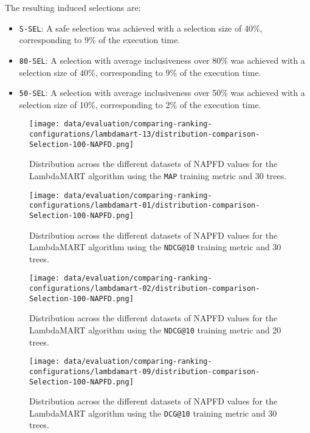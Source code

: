 The resulting induced selections are:
\begin{itemize}
    \item \texttt{S-SEL}: A safe selection was achieved with a selection size of 40\%, corresponding to 9\% of the execution time.
    \item \texttt{80-SEL}: A selection with average inclusiveness over 80\% was achieved with a selection size of 40\%, corresponding to 9\% of the execution time.
    \item \texttt{50-SEL}: A selection with average inclusiveness over 50\% was achieved with a selection size of 10\%, corresponding to 2\% of the execution time.
\end{itemize}

\begin{figure}
    \centering
    \begin{minipage}{.45\textwidth}
        \centering
        \label{fig:lambdamart-13-napfd}
        \texttt{[image: data/evaluation/comparing-ranking-configurations/lambdamart-13/distribution-comparison-Selection-100-NAPFD.png]}
        \parbox{0.9\textwidth}{\caption{Distribution across the different datasets of NAPFD values for the LambdaMART algorithm using the \texttt{MAP} training metric and 30 trees.}}
    \end{minipage}%
    \begin{minipage}{.45\textwidth}
        \centering
        \label{fig:lambdamart-01-napfd}
        \texttt{[image: data/evaluation/comparing-ranking-configurations/lambdamart-01/distribution-comparison-Selection-100-NAPFD.png]}
        \parbox{0.9\textwidth}{\caption{Distribution across the different datasets of NAPFD values for the LambdaMART algorithm using the \texttt{NDCG@10} training metric and 30 trees.}}
    \end{minipage}%
\end{figure}

\begin{figure}
    \centering
    \begin{minipage}{.45\textwidth}
        \centering
        \label{fig:lambdamart-02-napfd}
        \texttt{[image: data/evaluation/comparing-ranking-configurations/lambdamart-02/distribution-comparison-Selection-100-NAPFD.png]}
        \parbox{0.9\textwidth}{\caption{Distribution across the different datasets of NAPFD values for the LambdaMART algorithm using the \texttt{NDCG@10} training metric and 20 trees.}}
    \end{minipage}%
    \begin{minipage}{.45\textwidth}
        \centering
        \label{fig:lambdamart-09-napfd}
        \texttt{[image: data/evaluation/comparing-ranking-configurations/lambdamart-09/distribution-comparison-Selection-100-NAPFD.png]}
        \parbox{0.9\textwidth}{\caption{Distribution across the different datasets of NAPFD values for the LambdaMART algorithm using the \texttt{DCG@10} training metric and 30 trees.}}
    \end{minipage}%
\end{figure}

